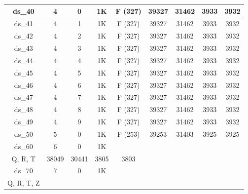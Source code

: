 \begin{footnotesize}
\begin{longtable}{|c|c|c|c|c|c|c|c|c|}
ds\_40      & 4           & 0           & 1K        & F (327)                     & 39327         & 31462          & 3933           & 3932          \\ \hline
ds\_41      & 4           & 1           & 1K        & F (327)                     & 39327         & 31462          & 3933           & 3932          \\ \hline
ds\_42      & 4           & 2           & 1K        & F (327)                     & 39327         & 31462          & 3933           & 3932          \\ \hline
ds\_43      & 4           & 3           & 1K        & F (327)                     & 39327         & 31462          & 3933           & 3932          \\ \hline
ds\_44      & 4           & 4           & 1K        & F (327)                     & 39327         & 31462          & 3933           & 3932          \\ \hline
ds\_45      & 4           & 5           & 1K        & F (327)                     & 39327         & 31462          & 3933           & 3932          \\ \hline
ds\_46      & 4           & 6           & 1K        & F (327)                     & 39327         & 31462          & 3933           & 3932          \\ \hline
ds\_47      & 4           & 7           & 1K        & F (327)                     & 39327         & 31462          & 3933           & 3932          \\ \hline
ds\_48      & 4           & 8           & 1K        & F (327)                     & 39327         & 31462          & 3933           & 3932          \\ \hline
ds\_49      & 4           & 9           & 1K        & F (327)                     & 39327         & 31462          & 3933           & 3932          \\ \hline
ds\_50      & 5           & 0           & 1K        & F (253)                     & 39253         & 31403          & 3925           & 3925          \\ \hline
ds\_60      & 6           & 0           & 1K        & \begin{tabular}{@{}c@{}}D, F, N, \\ Q, R, T\end{tabular}             
																					& 38049         & 30441          & 3805           & 3803          \\ \hline
ds\_70      & 7           & 0           & 1K        & \begin{tabular}{@{}c@{}}D, F, N, \\ Q, R, T, Z\end{tabular}

\end{longtable}
\end{footnotesize}
